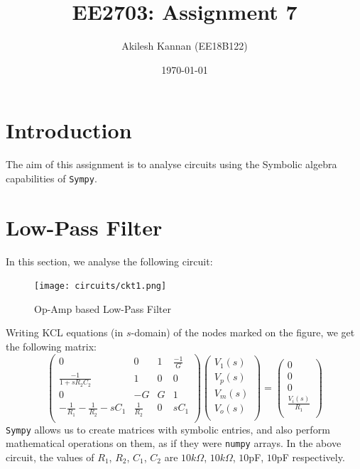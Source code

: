 \documentclass[11pt, a4paper, twoside]{article}
\title{EE2703: Assignment 7}
\author{Akilesh Kannan (EE18B122)}
\date{\today}
\begin{document}
\maketitle

\section{Introduction}
The aim of this assignment is to analyse circuits using the Symbolic algebra capabilities of \texttt{Sympy}.

\section{Low-Pass Filter}
    In this section, we analyse the following circuit:
    \begin{figure}[H]
        \centering
        \texttt{[image: circuits/ckt1.png]}
        \caption{Op-Amp based Low-Pass Filter}
        \label{fig:ckt1}
    \end{figure}
    Writing KCL equations (in $s$-domain) of the nodes marked on the figure, we get the following matrix:
    \begin{equation}
        \begin{pmatrix}
            0&0&1&\frac{-1}{G}\\
            \frac{-1}{1+sR_2C_2}&1&0&0\\
            0&-G&G&1\\
            -\frac{1}{R_1}-\frac{1}{R_2}-sC_1&\frac{1}{R_2}&0&sC_1\\
        \end{pmatrix}
        \begin{pmatrix}
            V_1(s)\\
            V_p(s)\\
            V_m(s)\\
            V_o(s)\\
        \end{pmatrix}
        =
        \begin{pmatrix}
            0\\
            0\\
            0\\
            \frac{V_i(s)}{R_1}\\
        \end{pmatrix}
    \end{equation}
    \texttt{Sympy} allows us to create matrices with symbolic entries, and also perform mathematical operations on them, as if they were \texttt{numpy} arrays. In the above circuit, the values of $R_1$, $R_2$, $C_1$, $C_2$ are $10k\Omega$, $10k\Omega$, $10$pF, $10$pF respectively.\\
    
\end{document}
